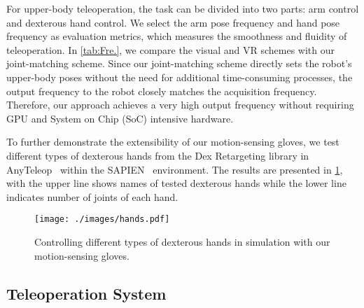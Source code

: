 For upper-body teleoperation, the task can be divided into two parts: arm control and dexterous hand control. We select the arm pose frequency and hand pose frequency as evaluation metrics, which measures the smoothness and fluidity of teleoperation. In \cref{tab:Fre.}, we compare the visual and VR schemes with our joint-matching scheme. Since our joint-matching scheme directly sets the robot's upper-body poses without the need for additional time-consuming processes, the output frequency to the robot closely matches the acquisition frequency. Therefore, our approach achieves a very high output frequency without requiring GPU and System on Chip (SoC) intensive hardware.
\begin{table}[!ht]
    \centering
    \caption{Upper-body teleoperation frequency of output to the robot's arm and hand. (SoC: System on Chip)}
    \label{tab:Fre.}
\end{table}

To further demonstrate the extensibility of our motion-sensing gloves, we test different types of dexterous hands from the Dex Retargeting library in AnyTeleop~\cite{qin2023anyteleop} within the SAPIEN~\cite{Xiang_2020_SAPIEN} environment. The results are presented in \cref{fig:hand}, with the upper line shows names of tested dexterous hands while the lower line indicates number of joints of each hand.
\begin{figure}[!ht]
  \centering
  \texttt{[image: ./images/hands.pdf]}
  \caption{Controlling different types of dexterous hands in simulation with our motion-sensing gloves.}
  \label{fig:hand}
  \vspace{-5pt}
\end{figure}


\subsection{Teleoperation System}
